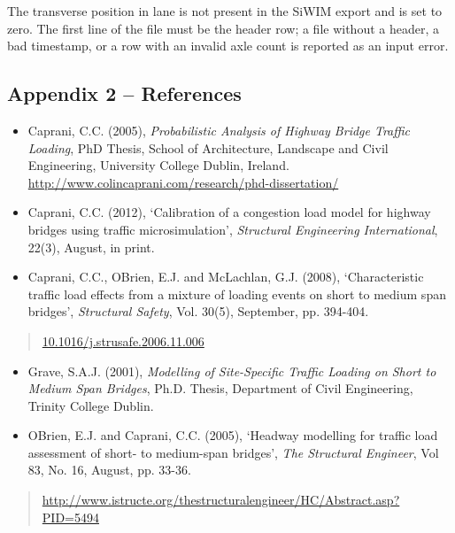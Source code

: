 \documentclass[
]{article}
\begin{document}
The transverse position in lane is not present in the SiWIM export and
is set to zero. The first line of the file must be the header row; a
file without a header, a bad timestamp, or a row with an invalid axle
count is reported as an input error.

\subsection{Appendix 2 -- References}\label{appendix-2-references}

\begin{itemize}
\item
  Caprani, C.C. (2005), \emph{Probabilistic Analysis of Highway Bridge
  Traffic Loading}, PhD Thesis, School of Architecture, Landscape and
  Civil Engineering, University College Dublin, Ireland.
  \url{http://www.colincaprani.com/research/phd-dissertation/}
\item
  Caprani, C.C. (2012), `Calibration of a congestion load model for
  highway bridges using traffic microsimulation', \emph{Structural
  Engineering International}, 22(3), August, in print.
\item
  Caprani, C.C., OBrien, E.J. and McLachlan, G.J. (2008),
  `Characteristic traffic load effects from a mixture of loading events
  on short to medium span bridges', \emph{Structural Safety}, Vol.
  30(5), September, pp. 394-404.
\end{itemize}

\begin{quote}
\href{http://www.colincaprani.com/wordpress/go.php?http://dx.doi.org/10.1016/j.strusafe.2006.11.006}{10.1016/j.strusafe.2006.11.006}
\end{quote}

\begin{itemize}
\item
  Grave, S.A.J. (2001), \emph{Modelling of Site-Specific Traffic Loading
  on Short to Medium Span Bridges}, Ph.D. Thesis, Department of Civil
  Engineering, Trinity College Dublin.
\item
  OBrien, E.J. and Caprani, C.C. (2005), `Headway modelling for traffic
  load assessment of short- to medium-span bridges', \emph{The
  Structural Engineer}, Vol 83, No. 16, August, pp. 33-36.
\end{itemize}

\begin{quote}
\href{http://www.colincaprani.com/wordpress/go.php?http://www.istructe.org/thestructuralengineer/HC/Abstract.asp?PID=5494}{http://www.istructe.org/thestructuralengineer/HC/Abstract.asp?PID=5494}
\end{quote}
\end{document}
